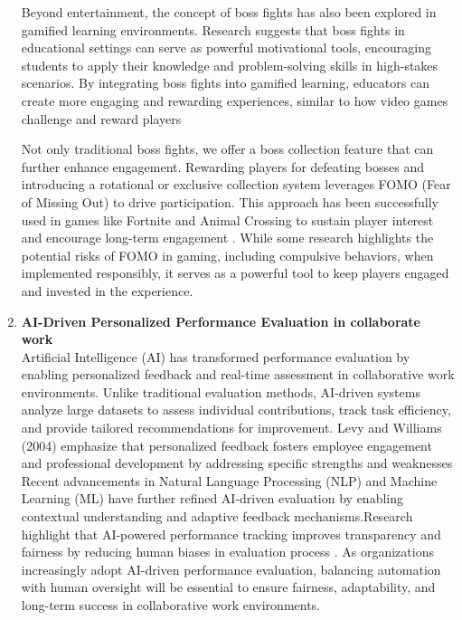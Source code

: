 \begin{enumerate}
        Beyond entertainment, the concept of boss fights has also been explored in gamified learning environments. Research suggests that boss fights in educational settings can serve as powerful motivational tools, encouraging students to apply their knowledge and problem-solving skills in high-stakes scenarios. By integrating boss fights into gamified learning, educators can create more engaging and rewarding experiences, similar to how video games challenge and reward players \cite{gamification:Education}
        
        Not only traditional boss fights, we offer a boss collection feature that can further enhance engagement. Rewarding players for defeating bosses and introducing a rotational or exclusive collection system leverages FOMO (Fear of Missing Out) to drive participation. This approach has been successfully used in games like Fortnite and Animal Crossing to sustain player interest and encourage long-term engagement \cite{medium:FOMO}. While some research highlights the potential risks of FOMO in gaming, 
        including compulsive behaviors, when implemented responsibly, it serves as a powerful tool to keep players engaged and invested in the experience.\cite{FOMO:1} \cite{FOMO:2}


    \item \textbf{AI-Driven Personalized Performance Evaluation in collaborate work} \\
        Artificial Intelligence (AI) has transformed performance evaluation by enabling personalized feedback and real-time assessment in collaborative work environments. Unlike traditional evaluation methods, AI-driven systems analyze large datasets to assess individual contributions, track task efficiency, and provide tailored recommendations for improvement. Levy and Williams (2004) emphasize that personalized feedback fosters employee engagement and professional development by addressing specific strengths and weaknesses \cite{Management:SocialContext} Recent advancements in Natural Language Processing (NLP) and Machine Learning (ML) have further refined AI-driven evaluation by enabling contextual understanding and adaptive feedback mechanisms.Research highlight that AI-powered performance tracking improves transparency and fairness by reducing human biases in evaluation process \cite{AI:humanResource}. As organizations increasingly adopt AI-driven performance evaluation, balancing automation with human oversight will be essential to ensure fairness, adaptability, and long-term success in collaborative work environments.


\end{enumerate}
